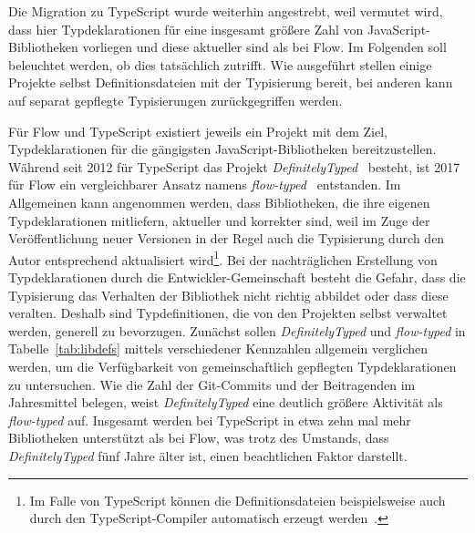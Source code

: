 Die Migration zu TypeScript wurde weiterhin angestrebt, weil vermutet wird, dass hier Typdeklarationen für eine insgesamt größere Zahl von JavaScript-Bibliotheken vorliegen und diese aktueller sind als bei Flow. Im Folgenden soll beleuchtet werden, ob dies tatsächlich zutrifft. Wie ausgeführt stellen einige Projekte selbst Definitionsdateien mit der Typisierung bereit, bei anderen kann auf separat gepflegte Typisierungen zurückgegriffen werden.

Für Flow und TypeScript existiert jeweils ein Projekt mit dem Ziel, Typdeklarationen für die gängigsten JavaScript-Bibliotheken bereitzustellen. Während seit 2012 für TypeScript das Projekt \textit{DefinitelyTyped}~\autocite{DEFINITELY_TYPED} besteht, ist 2017 für Flow ein vergleichbarer Ansatz namens \textit{flow-typed}~\autocite{FLOW_TYPED} entstanden. Im Allgemeinen kann angenommen werden, dass Bibliotheken, die ihre eigenen Typdeklarationen mitliefern, aktueller und korrekter sind, weil im Zuge der Veröffentlichung neuer Versionen in der Regel auch die Typisierung durch den Autor entsprechend aktualisiert wird\footnote{Im Falle von TypeScript können die Definitionsdateien beispielsweise auch durch den TypeScript-Compiler automatisch erzeugt werden~\autocite{TSC:OPTIONS}.}. Bei der nachträglichen Erstellung von Typdeklarationen durch die Entwickler-Gemeinschaft besteht die Gefahr, dass die Typisierung das Verhalten der Bibliothek nicht richtig abbildet oder dass diese veralten. Deshalb sind Typdefinitionen, die von den Projekten selbst verwaltet werden, generell zu bevorzugen. Zunächst sollen \textit{DefinitelyTyped} und \textit{flow-typed} in Tabelle~\ref{tab:libdefs} mittels verschiedener Kennzahlen allgemein verglichen werden, um die Verfügbarkeit von gemeinschaftlich gepflegten Typdeklarationen zu untersuchen. Wie die Zahl der Git-Commits und der Beitragenden im Jahresmittel belegen, weist \textit{DefinitelyTyped} eine deutlich größere Aktivität als \textit{flow-typed} auf. Insgesamt werden bei TypeScript in etwa zehn mal mehr Bibliotheken unterstützt als bei Flow, was trotz des Umstands, dass \textit{DefinitelyTyped} fünf Jahre älter ist, einen beachtlichen Faktor darstellt.

\tablespace


